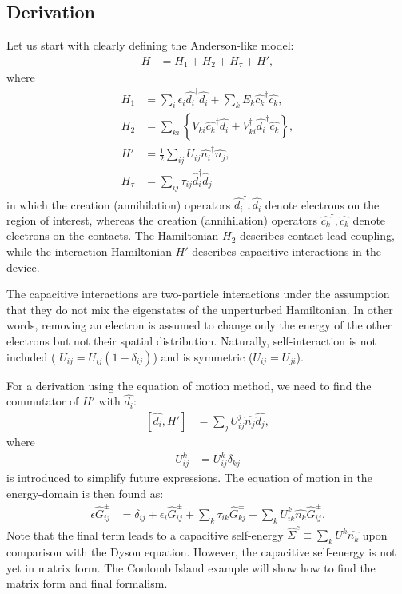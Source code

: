 \documentclass{article}
\begin{document}
\begin{multicols}{2}
    \section{Derivation}\label{sec:derivation}
        Let us start with clearly defining the Anderson-like model:
        \begin{align}
            H &= H_1 + H_2 + H_\tau + H', \label{eq:hamiltonian}
        \end{align}
        where
        \begin{align*}
        H_1 &= \sum_i \epsilon_i \hat{d_i}^\dagger \hat{d_i} + \sum_k E_k \hat{c_k}^\dagger \hat{c_k}, \\
        H_2 &= \sum_{ki}\left\{ V_{ki} \hat{c_k}^\dagger \hat{d_i} +  V_{ki}^\dagger \hat{d_i}^\dagger \hat{c_k} \right\},\\
        H' &= \frac{1}{2} \sum_{ij} U_{ij} \hat{n_i}^\dagger \hat{n_j},\\
        H_\tau &= \sum_{ij} \tau_{ij} \hat{d}_i^\dagger \hat{d}_j
        \end{align*}
        in which the creation (annihilation) operators $\hat{d_i}^\dagger, \hat{d_i}$ denote electrons on the region of interest, whereas the creation (annihilation) operators $\hat{c_k}^\dagger, \hat{c_k}$ denote electrons on the contacts. The Hamiltonian $H_2$ describes contact-lead coupling, while the interaction Hamiltonian $H'$ describes capacitive interactions in the device.
        
        The capacitive interactions are two-particle interactions under the assumption that they do not mix the eigenstates of the unperturbed Hamiltonian. In other words, removing an electron is assumed to change only the energy of the other electrons but not their spatial distribution. Naturally, self-interaction is not included ( $U_{ij} = U_{ij} (1-\delta_{ij})$) and is symmetric ($U_{ij} = U_{ji}$).
        
        For a derivation using the equation of motion method, we need to find the commutator of $H'$ with $\hat{d_i}$:
        \begin{align}
            \left[\hat{d_i}, H'\right] &= \sum_j U^j_{ij} \hat{n_j}\hat{d_j}, \label{eq:commutator}
        \end{align}
        where
        \begin{align*}
        U^k_{ij} &= U_{ij}^k \delta_{kj}
        \end{align*}
        is introduced to simplify future expressions. The equation of motion in the energy-domain is then found as:
        \begin{align*}
        \epsilon \hat{G}_{ij}^\pm &= \delta_{ij} + \epsilon_i \hat{G}_{ij}^\pm + \sum_k \tau_{ik} \hat{G}_{kj}^\pm + \sum_k U^k_{ik} \hat{n_k} \hat{G}_{ij}^\pm.
        \end{align*}
        Note that the final term leads to a capacitive self-energy $\hat{\Sigma}^c \equiv \sum_k U^k \hat{n_k}$ upon comparison with the Dyson equation. However, the capacitive self-energy is not yet in matrix form. The Coulomb Island example will show how to find the matrix form and final formalism.
        

\end{multicols}
\end{document}
